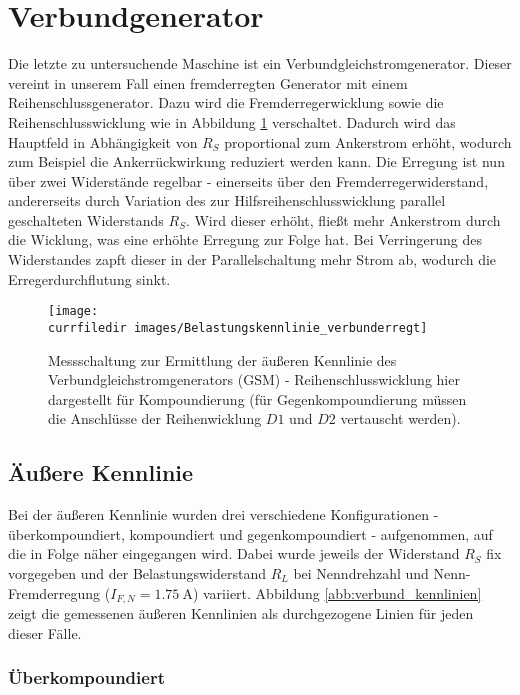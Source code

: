 \section{Verbundgenerator}
Die letzte zu untersuchende Maschine ist ein Verbundgleichstromgenerator. Dieser vereint in unserem Fall einen fremderregten Generator mit einem Reihenschlussgenerator. Dazu wird die Fremderregerwicklung sowie die Reihenschlusswicklung wie in Abbildung \ref{abb:verbund_BKL_Messschaltung} verschaltet. Dadurch wird das Hauptfeld in Abhängigkeit von $R_S$ proportional zum Ankerstrom erhöht, wodurch zum Beispiel die Ankerrückwirkung reduziert werden kann. Die Erregung ist nun über zwei Widerstände regelbar - einerseits über den Fremderregerwiderstand, andererseits durch Variation des zur Hilfsreihenschlusswicklung parallel geschalteten Widerstands $R_S$. Wird dieser erhöht, fließt mehr Ankerstrom durch die Wicklung, was eine erhöhte Erregung zur Folge hat. Bei Verringerung des Widerstandes zapft dieser in der Parallelschaltung mehr Strom ab, wodurch die Erregerdurchflutung sinkt. 

\begin{figure} [htb]
    \centering
    \texttt{[image: \\currfiledir images/Belastungskennlinie\_verbunderregt]}
    \caption{Messschaltung zur Ermittlung der äußeren Kennlinie des Verbund\-gleich\-strom\-generators (GSM) - Reihenschlusswicklung hier dargestellt für Kompoundierung (für Gegenkompoundierung müssen die Anschlüsse der Reihenwicklung $D1$ und $D2$ vertauscht werden).}
    \label{abb:verbund_BKL_Messschaltung}
\end{figure}

\subsection{Äußere Kennlinie}

Bei der äußeren Kennlinie wurden drei verschiedene Konfigurationen - überkompoundiert, kompoundiert und gegenkompoundiert - aufgenommen, auf die in Folge näher eingegangen wird. Dabei wurde jeweils der Widerstand $R_S$ fix vorgegeben und der Belastungswiderstand $R_L$ bei Nenndrehzahl und Nenn-Fremderregung ($I_{F,N}= \SI{1.75}{\ampere}$) variiert. Abbildung \ref{abb:verbund_kennlinien} zeigt die gemessenen äußeren Kennlinien als durchgezogene Linien für jeden dieser Fälle.

\subsubsection{Überkompoundiert}

